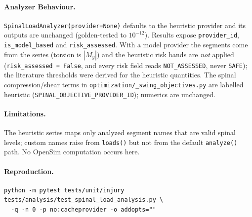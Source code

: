 \paragraph{Analyzer Behaviour.}
\texttt{SpinalLoadAnalyzer(provider=None)} defaults to the heuristic provider
and its outputs are unchanged (golden-tested to $10^{-12}$). Results expose
\texttt{provider\_id}, \texttt{is\_model\_based} and \texttt{risk\_assessed}.
With a model provider the segments come from the series (torsion is
$|M_y|$) and the heuristic risk bands are \emph{not} applied
(\texttt{risk\_assessed = False}, and every risk field reads \texttt{NOT\_ASSESSED}, never \texttt{SAFE}); the literature thresholds were derived for
the heuristic quantities. The spinal compression/shear terms in
\texttt{optimization/\_swing\_objectives.py} are labelled heuristic
(\texttt{SPINAL\_OBJECTIVE\_PROVIDER\_ID}); numerics are unchanged.

\paragraph{Limitations.}
The heuristic series maps only analyzed segment names that are valid spinal
levels; custom names raise from \texttt{loads()} but not from the default
\texttt{analyze()} path. No OpenSim computation occurs here.

\paragraph{Reproduction.}
\begin{verbatim}
python -m pytest tests/unit/injury tests/analysis/test_spinal_load_analysis.py \
  -q -n 0 -p no:cacheprovider -o addopts=""
\end{verbatim}
